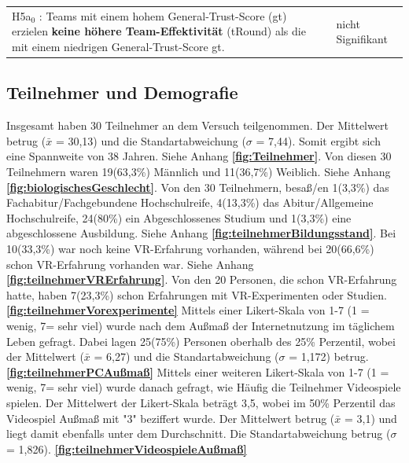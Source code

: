 \documentclass[a4paper,11pt]{article}%
\renewcommand{\\}{\vspace*{0.5\baselineskip} \newline}
\begin{document}
\begin{table}[H]
\begin{tabularx}{\textwidth}{p{12cm} | p{3.5cm}}
		\hline 	\\
		
		H5a$_{0}$ : Teams mit einem hohem General-Trust-Score (\ac{gt}) erzielen \textbf{keine höhere Team-Effektivität} (\ac{tRound}) als die mit einem niedrigen General-Trust-Score \ac{gt}.\\		
		& nicht Signifikant \\
		
		\hline 	\\
	\end{tabularx}
\end{table}		

\newpage

	\subsection{Teilnehmer und Demografie}
Insgesamt haben 30 Teilnehmer an dem Versuch teilgenommen. Der Mittelwert betrug ($\bar{x}$ = 30,13) und die Standartabweichung ($\sigma$ = 7,44). Somit ergibt sich eine Spannweite von 38 Jahren. Siehe Anhang \textbf{\autoref{fig:Teilnehmer}}.\\
Von diesen 30 Teilnehmern waren 19(63,3\%) Männlich und 11(36,7\%) Weiblich. Siehe Anhang \textbf{\autoref{fig:biologischesGeschlecht}}.\\
Von den 30 Teilnehmern, besaß/en 1(3,3\%) das Fachabitur/Fachgebundene Hochschulreife, 4(13,3\%) das Abitur/Allgemeine Hochschulreife, 24(80\%) ein Abgeschlossenes Studium und 1(3,3\%) eine abgeschlossene Ausbildung. Siehe Anhang \textbf{\autoref{fig:teilnehmerBildungsstand}}.\\
Bei 10(33,3\%) war noch keine VR-Erfahrung vorhanden, während bei 20(66,6\%) schon VR-Erfahrung vorhanden war. Siehe Anhang \textbf{\autoref{fig:teilnehmerVRErfahrung}}.\\ 
Von den 20 Personen, die schon VR-Erfahrung hatte, haben 7(23,3\%) schon Erfahrungen mit VR-Experimenten oder Studien. \textbf{\autoref{fig:teilnehmerVorexperimente}} \\
Mittels einer Likert-Skala von 1-7 (1 = wenig, 7= sehr viel) wurde nach dem Außmaß der Internetnutzung im täglichem Leben gefragt. Dabei lagen 25(75\%) Personen oberhalb des 25\% Perzentil, wobei der Mittelwert ($\bar{x}$ = 6,27) und die Standartabweichung ($\sigma$ = 1,172) betrug. \textbf{\autoref{fig:teilnehmerPCAußmaß}} \\ 
Mittels einer weiteren Likert-Skala von 1-7 (1 = wenig, 7= sehr viel) wurde danach gefragt, wie Häufig die Teilnehmer Videospiele spielen. Der Mittelwert der Likert-Skala beträgt 3,5, wobei im 50\% Perzentil das Videospiel Außmaß mit "3" beziffert wurde. Der Mittelwert betrug ($\bar{x}$ = 3,1) und liegt damit ebenfalls unter dem Durchschnitt. Die Standartabweichung betrug ($\sigma$ = 1,826). \textbf{\autoref{fig:teilnehmerVideospieleAußmaß}}
\end{document}
